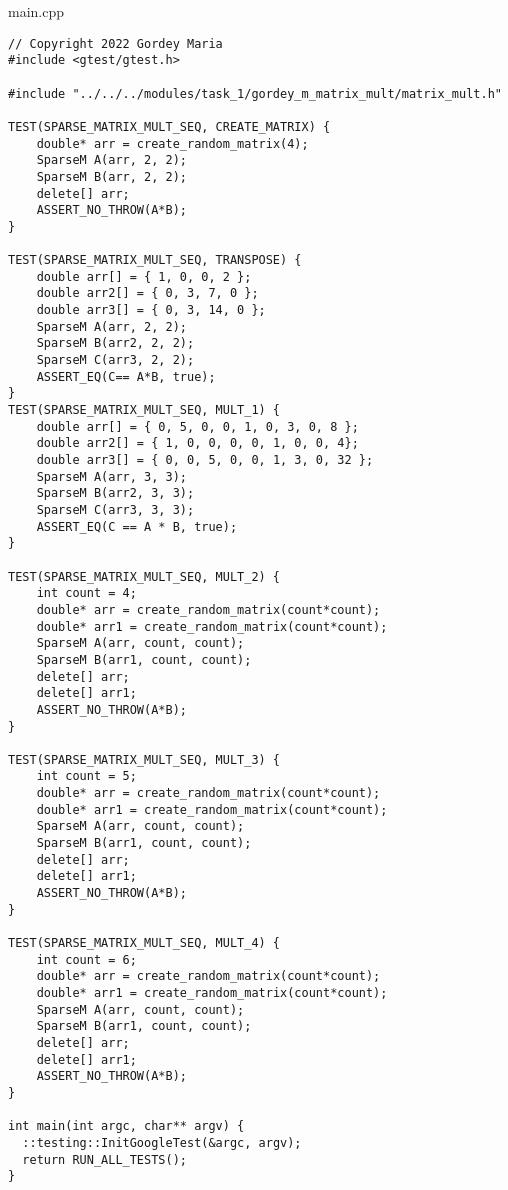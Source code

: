\documentclass{report}
\begin{document}
main.cpp
\begin{lstlisting}
// Copyright 2022 Gordey Maria
#include <gtest/gtest.h>

#include "../../../modules/task_1/gordey_m_matrix_mult/matrix_mult.h"

TEST(SPARSE_MATRIX_MULT_SEQ, CREATE_MATRIX) {
    double* arr = create_random_matrix(4);
    SparseM A(arr, 2, 2);
    SparseM B(arr, 2, 2);
    delete[] arr;
    ASSERT_NO_THROW(A*B);
}

TEST(SPARSE_MATRIX_MULT_SEQ, TRANSPOSE) {
    double arr[] = { 1, 0, 0, 2 };
    double arr2[] = { 0, 3, 7, 0 };
    double arr3[] = { 0, 3, 14, 0 };
    SparseM A(arr, 2, 2);
    SparseM B(arr2, 2, 2);
    SparseM C(arr3, 2, 2);
    ASSERT_EQ(C== A*B, true);
}
TEST(SPARSE_MATRIX_MULT_SEQ, MULT_1) {
    double arr[] = { 0, 5, 0, 0, 1, 0, 3, 0, 8 };
    double arr2[] = { 1, 0, 0, 0, 0, 1, 0, 0, 4};
    double arr3[] = { 0, 0, 5, 0, 0, 1, 3, 0, 32 };
    SparseM A(arr, 3, 3);
    SparseM B(arr2, 3, 3);
    SparseM C(arr3, 3, 3);
    ASSERT_EQ(C == A * B, true);
}

TEST(SPARSE_MATRIX_MULT_SEQ, MULT_2) {
    int count = 4;
    double* arr = create_random_matrix(count*count);
    double* arr1 = create_random_matrix(count*count);
    SparseM A(arr, count, count);
    SparseM B(arr1, count, count);
    delete[] arr;
    delete[] arr1;
    ASSERT_NO_THROW(A*B);
}

TEST(SPARSE_MATRIX_MULT_SEQ, MULT_3) {
    int count = 5;
    double* arr = create_random_matrix(count*count);
    double* arr1 = create_random_matrix(count*count);
    SparseM A(arr, count, count);
    SparseM B(arr1, count, count);
    delete[] arr;
    delete[] arr1;
    ASSERT_NO_THROW(A*B);
}

TEST(SPARSE_MATRIX_MULT_SEQ, MULT_4) {
    int count = 6;
    double* arr = create_random_matrix(count*count);
    double* arr1 = create_random_matrix(count*count);
    SparseM A(arr, count, count);
    SparseM B(arr1, count, count);
    delete[] arr;
    delete[] arr1;
    ASSERT_NO_THROW(A*B);
}

int main(int argc, char** argv) {
  ::testing::InitGoogleTest(&argc, argv);
  return RUN_ALL_TESTS();
}

\end{lstlisting}
\end{document}
